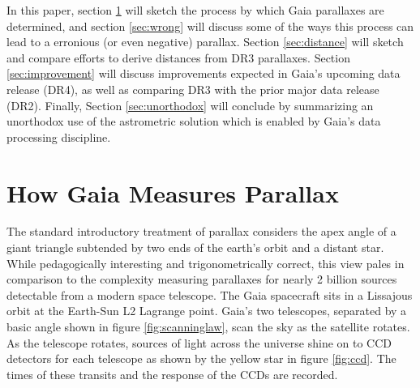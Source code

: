 \documentclass[preprint2]{aastex631}
\begin{document}
In this paper, section \ref{sec:parallax} will sketch the process by which Gaia parallaxes are determined, and section \ref{sec:wrong} will discuss some of the ways this process can lead to a erronious (or even negative) parallax. Section \ref{sec:distance} will sketch and compare efforts to derive distances from DR3 parallaxes. Section \ref{sec:improvement} will discuss improvements expected in Gaia's upcoming data release (DR4), as well as comparing DR3 with the prior major data release (DR2). Finally, Section \ref{sec:unorthodox} will conclude by summarizing an unorthodox use of the astrometric solution which is enabled by Gaia's data processing discipline.

\section{How Gaia Measures Parallax} \label{sec:parallax}

The standard introductory treatment of parallax considers the apex angle of a giant triangle subtended by two ends of the earth's orbit and a distant star. While pedagogically interesting and trigonometrically correct, this view pales in comparison to the complexity measuring parallaxes for nearly 2 billion sources detectable from a modern space telescope. The Gaia spacecraft sits in a Lissajous orbit at the Earth-Sun L2 Lagrange point. Gaia's two telescopes, separated by a basic angle shown in figure \ref{fig:scanninglaw}, scan the sky as the satellite rotates. As the telescope rotates, sources of light across the universe shine on to CCD detectors for each telescope as shown by the yellow star in figure \ref{fig:ccd}. The times of these transits and the response of the CCDs are recorded.
\end{document}
